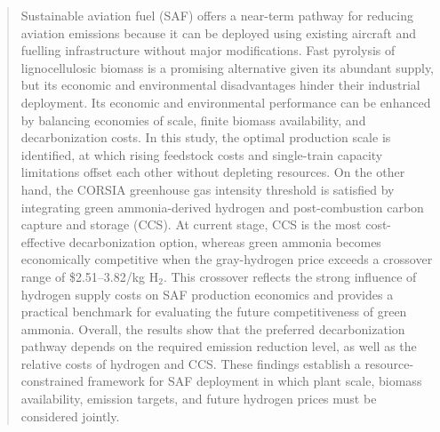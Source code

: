\documentclass[a4paper,fleqn]{cas-sc}
\begin{document}






\begin{abstract}
Sustainable aviation fuel (SAF) offers a near-term pathway for reducing aviation emissions because it can be deployed using existing aircraft and fuelling infrastructure without major modifications. Fast pyrolysis of lignocellulosic biomass is a promising alternative given its abundant supply, but its economic and environmental disadvantages hinder their industrial deployment.  
Its economic and environmental performance can be enhanced by balancing economies of scale, finite biomass availability, and decarbonization costs. In this study, the optimal production scale is identified, at which rising feedstock costs and single-train capacity limitations offset each other without depleting resources. 
On the other hand, the CORSIA greenhouse gas intensity threshold is satisfied by integrating green ammonia-derived hydrogen and post-combustion carbon capture and storage (CCS). At current stage, CCS is the most cost-effective decarbonization option, whereas green ammonia becomes economically competitive when the gray-hydrogen price exceeds a crossover range of \$2.51--3.82/kg H$_2$. This crossover reflects the strong influence of hydrogen supply costs on SAF production economics and provides a practical benchmark for evaluating the future competitiveness of green ammonia. 
Overall, the results show that the preferred decarbonization pathway depends on the required emission reduction level, as well as the relative costs of hydrogen and CCS. These findings establish a resource-constrained framework for SAF deployment in which plant scale, biomass availability, emission targets, and future hydrogen prices must be considered jointly.
\end{abstract}
\end{document}

